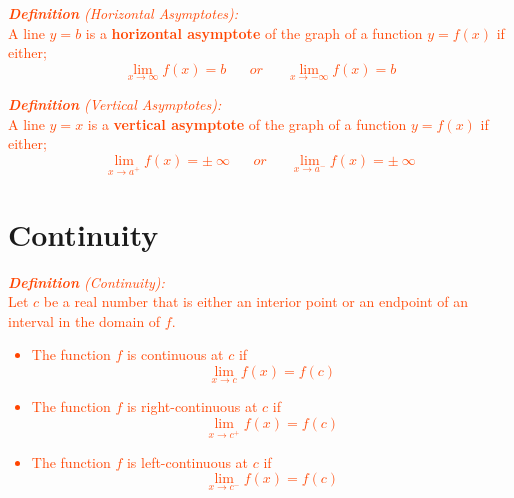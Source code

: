 \documentclass{report}
\newenvironment{definition}[1][OrangeRed]
  {\begin{tcolorbox}[colframe=#1,colback=white]}
  {\end{tcolorbox}}
\begin{document}
\begin{definition}
    \textcolor{OrangeRed}{\textit{\textbf{Definition} (Horizontal Asymptotes):}\\
    A line $y = b$ is a \textbf{horizontal asymptote} of the graph of a function $y=f(x)$ if either;
    \begin{equation}
        \lim_{x \to \infty} f(x) = b \; \; \; \; \; \; or \; \; \; \; \; \; \lim_{x \to -\infty} f(x) = b
    \end{equation}}
\end{definition}


\begin{definition}
    \textcolor{OrangeRed}{\textit{\textbf{Definition} (Vertical Asymptotes):}\\
    A line $y = x$ is a \textbf{vertical asymptote} of the graph of a function $y=f(x)$ if either;
    \begin{equation}
        \lim_{x \to a^+} f(x) = \pm \: \infty \; \; \; \; \; \; or \; \; \; \; \; \; \lim_{x \to a^-} f(x) = \pm \: \infty
    \end{equation}}
\end{definition}

\section{Continuity}

\begin{definition}
    \textcolor{OrangeRed}{\textit{\textbf{Definition} (Continuity):}\\
   Let $c$ be a real number that is either an interior point or an endpoint of an interval in the domain of $f$.\\
   \begin{itemize}
       \item The function $f$ is continuous at $c$ if
       \begin{equation}
           \lim_{x \to c} f(x) = f(c)
       \end{equation}
       \item The function $f$ is right-continuous at $c$ if
       \begin{equation}
           \lim_{x \to c^+} f(x) = f(c)
       \end{equation}
       \item The function $f$ is left-continuous at $c$ if
       \begin{equation}
           \lim_{x \to c^-} f(x) = f(c)
       \end{equation}
   \end{itemize}}
\end{definition}
\end{document}
